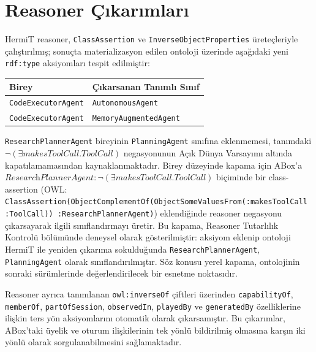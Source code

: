 \documentclass[10pt, a4paper, twocolumn]{article}
\begin{document}
\clearpage
\section{Reasoner Çıkarımları}
\label{app:reasoner}

HermiT reasoner, \texttt{ClassAssertion} ve \texttt{InverseObjectProperties} üreteçleriyle çalıştırılmış; sonuçta materializasyon edilen ontoloji üzerinde aşağıdaki yeni \texttt{rdf:type} aksiyomları tespit edilmiştir:

\begin{center}
\scriptsize
\begin{tabular}{|p{3cm}|p{4cm}|}
\hline
\textbf{Birey} & \textbf{Çıkarsanan Tanımlı Sınıf} \\
\hline
\texttt{CodeExecutorAgent} & \texttt{AutonomousAgent} \\
\hline
\texttt{CodeExecutorAgent} & \texttt{MemoryAugmentedAgent} \\
\hline
\end{tabular}
\label{tab:reasoner-classes}
\end{center}

\texttt{ResearchPlannerAgent} bireyinin \texttt{PlanningAgent} sınıfına eklenmemesi, tanımdaki $\lnot(\exists \textit{makesToolCall}.\textit{ToolCall})$ negasyonunun Açık Dünya Varsayımı altında kapatılamamasından kaynaklanmaktadır. Birey düzeyinde kapama için ABox'a $\textit{ResearchPlannerAgent} : \lnot(\exists \textit{makesToolCall}.\textit{ToolCall})$ biçiminde bir class-assertion (OWL: \texttt{Class\-Assertion(Object\-Complement\-Of(Object\-Some\-Values\-From(:makesToolCall :ToolCall)) :Research\-PlannerAgent)}) eklendiğinde reasoner negasyonu çıkarsayarak ilgili sınıflandırmayı üretir. Bu kapama, Reasoner Tutarlılık Kontrolü bölümünde deneysel olarak gösterilmiştir: aksiyom eklenip ontoloji HermiT ile yeniden çıkarıma sokulduğunda \texttt{ResearchPlannerAgent}, \texttt{PlanningAgent} olarak sınıflandırılmıştır. Söz konusu yerel kapama, ontolojinin sonraki sürümlerinde değerlendirilecek bir esnetme noktasıdır.

Reasoner ayrıca tanımlanan \texttt{owl:inverseOf} çiftleri üzerinden \texttt{capabilityOf}, \texttt{memberOf}, \texttt{partOfSession}, \texttt{observedIn}, \texttt{playedBy} ve \texttt{generatedBy} özelliklerine ilişkin ters yön aksiyomlarını otomatik olarak çıkarsamıştır. Bu çıkarımlar, ABox'taki üyelik ve oturum ilişkilerinin tek yönlü bildirilmiş olmasına karşın iki yönlü olarak sorgulanabilmesini sağlamaktadır.
\end{document}
